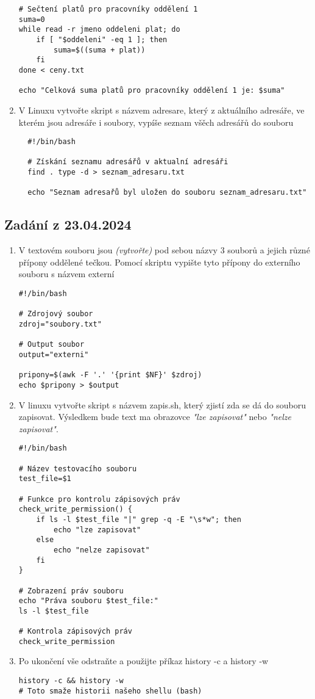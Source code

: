 \documentclass{article}
\begin{document}
\begin{enumerate}
\begin{lstlisting}[caption=skript secti.sh]
# Sečtení platů pro pracovníky oddělení 1
suma=0
while read -r jmeno oddeleni plat; do
    if [ "$oddeleni" -eq 1 ]; then
        suma=$((suma + plat))
    fi
done < ceny.txt

echo "Celková suma platů pro pracovníky oddělení 1 je: $suma"
\end{lstlisting}
\item V Linuxu vytvořte skript s názvem adresare, který z aktuálního adresáře, ve kterém jsou adresáře i soubory, vypíše seznam všěch adresářů do souboru
\begin{lstlisting}
  #!/bin/bash

  # Získání seznamu adresářů v aktualní adresáři
  find . type -d > seznam_adresaru.txt

  echo "Seznam adresařů byl uložen do souboru seznam_adresaru.txt"
\end{lstlisting}
\end{enumerate}
\subsection{Zadání z 23.04.2024}
\begin{enumerate}
  \item V textovém souboru jsou \textit{(vytvořte)} pod sebou názvy 3 souborů a jejich různé přípony oddělené tečkou. Pomocí skriptu vypište tyto přípony do externího souboru s názvem externí
\begin{lstlisting}
#!/bin/bash

# Zdrojový soubor
zdroj="soubory.txt"

# Output soubor
output="externi"

pripony=$(awk -F '.' '{print $NF}' $zdroj)
echo $pripony > $output
\end{lstlisting}
  \item V linuxu vytvořte skript s názvem zapis.sh, který zjistí zda se dá do souboru zapisovat. Výsledkem bude text ma obrazovce \textit{"lze zapisovat"} nebo \textit{"nelze zapisovat"}.
    \begin{lstlisting}[caption=zapis.sh musel jsem modifikovat pipe aby se zobrazil ale normálně je to jen ta vertikalní čárka]
#!/bin/bash

# Název testovacího souboru
test_file=$1

# Funkce pro kontrolu zápisových práv
check_write_permission() {
    if ls -l $test_file "|" grep -q -E "\s*w"; then
        echo "lze zapisovat"
    else
        echo "nelze zapisovat"
    fi
}

# Zobrazení práv souboru
echo "Práva souboru $test_file:"
ls -l $test_file

# Kontrola zápisových práv
check_write_permission
\end{lstlisting}
  \item Po ukončení vše odstraňte a použijte příkaz history -c a history -w
\begin{lstlisting}
history -c && history -w 
# Toto smaže historii našeho shellu (bash)
\end{lstlisting}
\end{enumerate}
\end{document}

